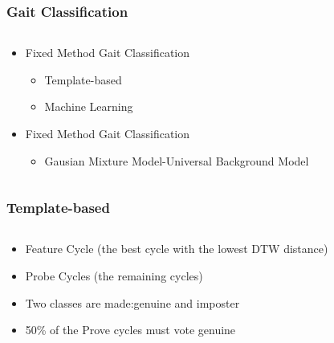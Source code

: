 \documentclass{beamer}
\begin{document}
\begin{frame}
\frametitle{Gait Classification}
 \begin{columns}
  \begin{column}{.5\textwidth}
  \begin{itemize}
		\item Fixed Method Gait Classification
			\begin{itemize}
				\item Template-based 
				\item Machine Learning 
			\end{itemize}
		\item Fixed Method Gait Classification
			\begin{itemize}
				\item Gausian Mixture Model-Universal Background Model
			\end{itemize}
  \end{itemize}
  \end{column}
  \begin{column}{0.7\textwidth}
       \\
  \end{column}
  \end{columns}  
\end{frame}


\begin{frame}
\frametitle{Template-based}
 \begin{columns}
  \begin{column}{.5\textwidth}
  \begin{itemize}
		\item Feature Cycle (the best cycle with the lowest DTW distance)
		\item Probe Cycles (the remaining cycles)
		\item Two classes are made:genuine and imposter
		\item 50\% of the Prove cycles must vote genuine		
  \end{itemize}
  \end{column}
  \begin{column}{0.7\textwidth}
       \\
  \end{column}
  \end{columns}  
\end{frame}
\end{document}
